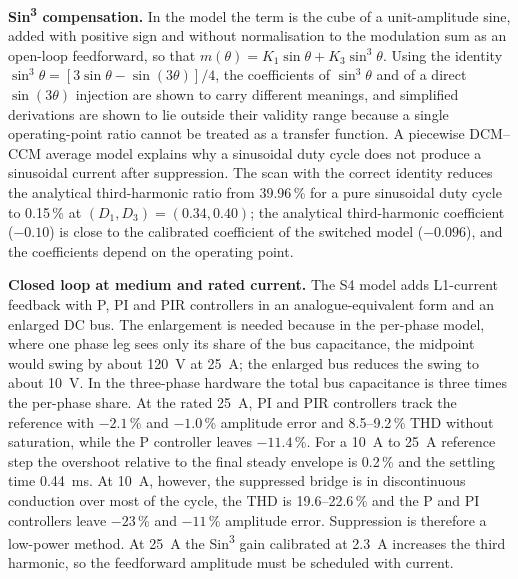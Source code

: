 \textbf{Sin\textsuperscript{3} compensation.} In the model the term is the cube of a unit-amplitude sine, added with positive sign and without normalisation to the modulation sum as an open-loop feedforward, so that $m(\theta)=K_1\sin\theta+K_3\sin^3\theta$. Using the identity $\sin^3\theta=[3\sin\theta-\sin(3\theta)]/4$, the coefficients of $\sin^3\theta$ and of a direct $\sin(3\theta)$ injection are shown to carry different meanings, and simplified derivations are shown to lie outside their validity range because a single operating-point ratio cannot be treated as a transfer function. A piecewise DCM--CCM average model explains why a sinusoidal duty cycle does not produce a sinusoidal current after suppression. The scan with the correct identity reduces the analytical third-harmonic ratio from 39.96\,\% for a pure sinusoidal duty cycle to 0.15\,\% at $(D_1,D_3)=(0.34,0.40)$; the analytical third-harmonic coefficient ($-0.10$) is close to the calibrated coefficient of the switched model ($-0.096$), and the coefficients depend on the operating point.

\textbf{Closed loop at medium and rated current.} The S4 model adds L1-current feedback with P, PI and PIR controllers in an analogue-equivalent form and an enlarged DC bus. The enlargement is needed because in the per-phase model, where one phase leg sees only its share of the bus capacitance, the midpoint would swing by about 120~V at 25~A; the enlarged bus reduces the swing to about 10~V. In the three-phase hardware the total bus capacitance is three times the per-phase share. At the rated 25~A, PI and PIR controllers track the reference with $-2.1$\,\% and $-1.0$\,\% amplitude error and 8.5--9.2\,\% THD without saturation, while the P controller leaves $-11.4$\,\%. For a 10~A to 25~A reference step the overshoot relative to the final steady envelope is 0.2\,\% and the settling time 0.44~ms. At 10~A, however, the suppressed bridge is in discontinuous conduction over most of the cycle, the THD is 19.6--22.6\,\% and the P and PI controllers leave $-23$\,\% and $-11$\,\% amplitude error. Suppression is therefore a low-power method. At 25~A the Sin\textsuperscript{3} gain calibrated at 2.3~A increases the third harmonic, so the feedforward amplitude must be scheduled with current.

